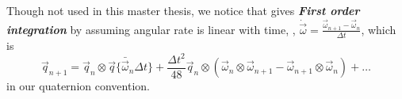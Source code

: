 Though not used in this master thesis, we notice that \cite{trawny2005indirect} gives \textbf{\textit{First order integration}} by assuming angular rate is linear with time, \ie, $\dot{\vec{\omega}} = \frac{\vec{\omega}_{n+1} - \vec{\omega}_{n}}{\Delta{t}}$, which is
\begin{equation} \label{q44} 
	\vec{q}_{n+1} = \vec{q}_n \otimes \vec{q}\{ \bar{\vec{\omega}}_{n}\Delta{t} \} + \frac{\Delta{t}^2}{48}\vec{q}_n\otimes(\vec{\omega}_n \otimes \vec{\omega}_{n+1} - \vec{\omega}_{n+1} \otimes \vec{\omega}_{n}) + \dots
\end{equation}
in our quaternion convention.